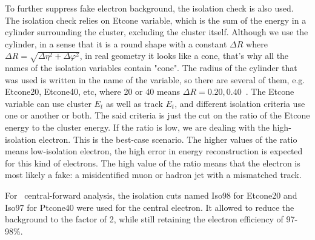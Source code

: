 To further suppress fake electron background, the isolation check is also used. The isolation check relies on Etcone variable, which is the sum of the energy in a cylinder surrounding the cluster, excluding the cluster itself. Although we use the cylinder, in a sense that it is a round shape with a constant $\Delta R$ where $\Delta R = \sqrt{\Delta\eta^{2} + \Delta\varphi^{2}}$, in real geometry it looks like a cone, that's why all the names of the isolation variables contain "cone".  The radius of the cylinder that was used is written in the name of the variable, so there are several of them, e.g. Etcone20, Etcone40, etc, where 20 or 40 means $\Delta R = 0.20 , 0.40$~\cite{lib:reco_iso}. The Etcone variable can use cluster $E_{t}$ as well as track $E_{t}$, and different isolation criteria use one or another or both. The said criteria is just the cut on the ratio of the Etcone energy to the cluster energy. If the ratio is low, we are dealing with the high-isolation electron. This is the best-case scenario. The higher values of the ratio means low-isolation electron, the high error in energy reconstruction is expected for this kind of electrons. The high value of the ratio means that the electron is most likely a fake: a misidentified muon or hadron jet with a mismatched track.

\begin{figure}
\end{figure}

For \Zee\ central-forward analysis, the isolation cuts named Iso98 for Etcone20 and Iso97 for Ptcone40 were used for the central electron. It allowed to reduce the background to the factor of 2, while still retaining the electron efficiency of 97-98\%.
